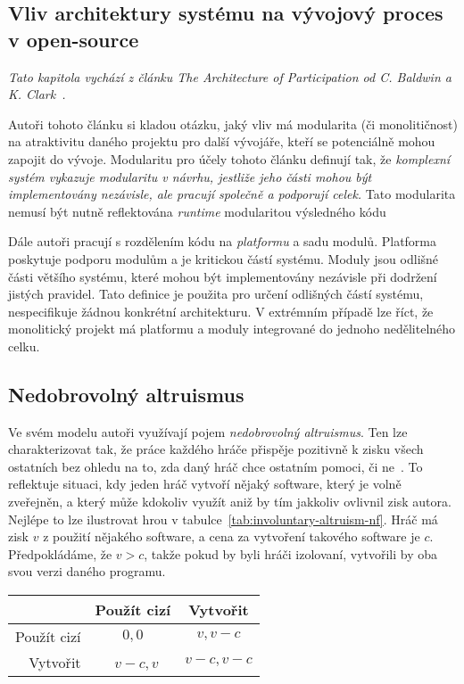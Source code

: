 \begin{multicols}{2}
\section{Vliv architektury systému na vývojový proces v open-source}
\label{ch:architecture-opensource}
	{\em Tato kapitola vychází z článku The Architecture of Participation od C. Baldwin a K. Clark~\cite{architecture-opensource}.}

	Autoři tohoto článku si kladou otázku, jaký vliv má modularita (či monolitičnost) na atraktivitu daného projektu pro další vývojáře, kteří se potenciálně mohou zapojit do vývoje. Modularitu pro účely tohoto článku definují tak, že {\em komplexní systém vykazuje modularitu v návrhu, jestliže jeho části mohou být implementovány nezávisle, ale pracují společně a podporují celek.} Tato modularita nemusí být nutně reflektována {\em runtime} modularitou výsledného kódu~\cite[kap. 2.1]{architecture-opensource}

	Dále autoři pracují s rozdělením kódu na {\em platformu} a sadu modulů. Platforma poskytuje podporu modulům a je kritickou částí systému. Moduly jsou odlišné části většího systému, které mohou být implementovány nezávisle při dodržení jistých pravidel. Tato definice je použita pro určení odlišných částí systému, nespecifikuje žádnou konkrétní architekturu. V extrémním případě lze říct, že monolitický projekt má platformu a moduly integrované do jednoho nedělitelného celku.

	\subsection*{Nedobrovolný altruismus}
	Ve svém modelu autoři využívají pojem {\em nedobrovolný altruismus}. Ten lze charakterizovat tak, že práce každého hráče přispěje pozitivně k zisku všech ostatních bez ohledu na to, zda daný hráč chce ostatním pomoci, či ne~\cite[kap. 3]{architecture-opensource}. To reflektuje situaci, kdy jeden hráč vytvoří nějaký software, který je volně zveřejněn, a který může kdokoliv využít aniž by tím jakkoliv ovlivnil zisk autora. Nejlépe to lze ilustrovat hrou v tabulce~\ref{tab:involuntary-altruism-nf}. Hráč má zisk $v$ z použití nějakého software, a cena za vytvoření takového software je $c$. Předpokládáme, že $v > c$, takže pokud by byli hráči izolovaní, vytvořili by oba svou verzi daného programu.

	\begin{Figure}
	\begin{center}
	\begin{tabular}{r| c c}
			& Použít cizí & Vytvořit \\
			\hline
		Použít cizí & $0,0$ &\cellcolor{gray!20} $v, v-c$ \\
		Vytvořit &\cellcolor{gray!20} $v-c, v$ & $v-c, v-c$ \\
	\end{tabular}
	\end{center}
	\label{tab:involuntary-altruism-nf}
	\end{Figure}


\end{multicols}
